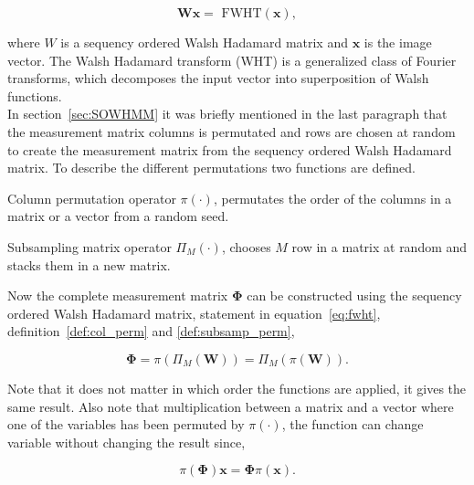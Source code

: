 \begin{equation}
\mathbf{W}\mathbf{x} = \text{ FWHT}(\mathbf{x}),
\label{eq:fwht}
\end{equation}

where $W$ is a sequency ordered Walsh Hadamard matrix and $\mathbf{x}$ is the image vector. The Walsh Hadamard transform (WHT) is a generalized class of Fourier transforms, which decomposes the input vector into superposition of Walsh functions.\\[0.1in]

In section~\ref{sec:SOWHMM} it was briefly mentioned in the last paragraph that the measurement matrix columns is permutated and rows are chosen at random to create the measurement matrix from the sequency ordered Walsh Hadamard matrix. To describe the different permutations two functions are defined.\\[0.1in] 

\theoremstyle{definition}
\begin{definition}{Column permutation operator}
$\pi(\cdot)$, permutates the order of the columns in a matrix or a vector from a random seed.
\label{def:col_perm}
\end{definition}

\theoremstyle{definition}
\begin{definition}{Subsampling matrix operator}
$\Pi_M(\cdot)$, chooses $M$ row in a matrix at random and stacks them in a new matrix.
\label{def:subsamp_perm}
\end{definition}


Now the complete measurement matrix $\mathbf{\Phi}$ can be constructed using the sequency ordered Walsh Hadamard matrix, statement in equation~\ref{eq:fwht}, definition~\ref{def:col_perm} and \ref{def:subsamp_perm},


\begin{equation}
\mathbf{\Phi} = \pi(\Pi_M(\mathbf{W})) = \Pi_M(\pi(\mathbf{W}))\text{.}
\end{equation}

Note that it does not matter in which order the functions are applied, it gives the same result. Also note that multiplication between a matrix and a vector where one of the variables has been permuted by $\pi(\cdot)$, the function can change variable without changing the result since,

\begin{equation}
\pi(\mathbf{\Phi})\mathbf{x} = \mathbf{\Phi}\pi(\mathbf{x})\text{.}
\label{eq:pi_trans}
\end{equation}


